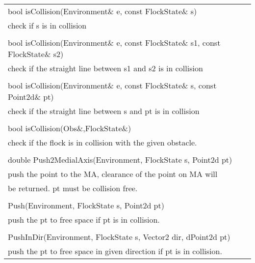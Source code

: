 \documentclass[onecolumn,10pt]{article}
\begin{document}
\begin{tabular}{l}
bool isCollision(Environment\& e, const FlockState\& s) \\
check if s is in collision \\\\

bool isCollision(Environment\& e, const FlockState\& s1, const FlockState\& s2) \\
check if the straight line between s1 and s2 is in collision \\\\

bool isCollision(Environment\& e, const FlockState\& s, const Point2d\& pt) \\
check if the straight line between s and pt is in collision \\\\

bool isCollision(Obs\&,FlockState\&) \\
check if the flock is in collision with the given obstacle. \\\\

double Push2MedialAxis(Environment, FlockState s, Point2d pt) \\
push the point to the MA, clearance of the point on MA will \\
be returned. pt must be collision free. \\\\

Push(Environment, FlockState s, Point2d pt)\\
push the pt to free space if pt is in collision. \\\\

PushInDir(Environment, FlockState s, Vector2 dir, dPoint2d pt)\\
push the pt to free space in given direction if pt is in collision. \\

\end{tabular}
\end{document}
